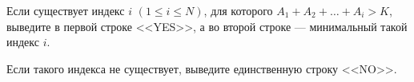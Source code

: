 Если существует индекс $i$ $(1 \le i \le N)$, для которого $A_1 + A_2 + \ldots + A_i > K$, выведите в первой строке <<YES>>, а во второй строке --- минимальный такой индекс $i$.

Если такого индекса не существует, выведите единственную строку <<NO>>.